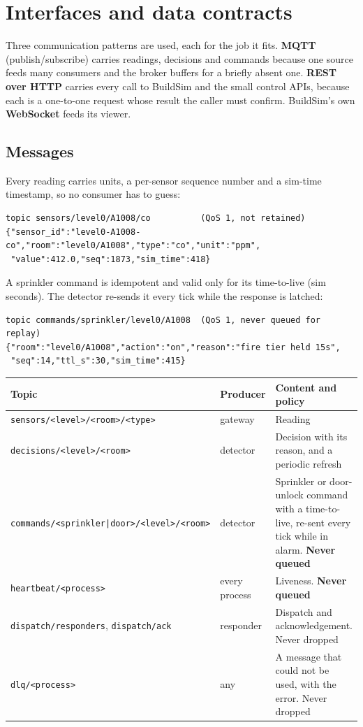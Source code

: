 \documentclass[11pt]{article}
\newcommand{\code}[1]{\texttt{#1}}
\begin{document}
\section{Interfaces and data contracts}

Three communication patterns are used, each for the job it fits. \textbf{MQTT} (publish/subscribe) carries readings, decisions and commands because one source feeds many consumers and the broker buffers for a briefly absent one. \textbf{REST over HTTP} carries every call to BuildSim and the small control APIs, because each is a one-to-one request whose result the caller must confirm. BuildSim's own \textbf{WebSocket} feeds its viewer.

\subsection{Messages}
Every reading carries units, a per-sensor sequence number and a sim-time timestamp, so no consumer has to guess:
\begin{verbatim}
topic sensors/level0/A1008/co          (QoS 1, not retained)
{"sensor_id":"level0-A1008-co","room":"level0/A1008","type":"co","unit":"ppm",
 "value":412.0,"seq":1873,"sim_time":418}
\end{verbatim}
A sprinkler command is idempotent and valid only for its time-to-live (sim seconds). The detector re-sends it every tick while the response is latched:
\begin{verbatim}
topic commands/sprinkler/level0/A1008  (QoS 1, never queued for replay)
{"room":"level0/A1008","action":"on","reason":"fire tier held 15s",
 "seq":14,"ttl_s":30,"sim_time":415}
\end{verbatim}

{\setlength{\extrarowheight}{1pt}\begin{longtable}{@{}L{6.6cm}L{2.2cm}L{6.8cm}@{}}
\toprule
Topic & Producer & Content and policy\\
\midrule\endhead
\code{sensors/<level>/<room>/<type>} & gateway & Reading\\
\code{decisions/<level>/<room>} & detector & Decision with its reason, and a periodic refresh\\
\code{commands/<sprinkler|door>/<level>/<room>} & detector & Sprinkler or door-unlock command with a time-to-live, re-sent every tick while in alarm. \textbf{Never queued}\\
\code{heartbeat/<process>} & every process & Liveness. \textbf{Never queued}\\
\code{dispatch/responders}, \code{dispatch/ack} & responder & Dispatch and acknowledgement. Never dropped\\
\code{dlq/<process>} & any & A message that could not be used, with the error. Never dropped\\
\bottomrule
\end{longtable}}
\end{document}
